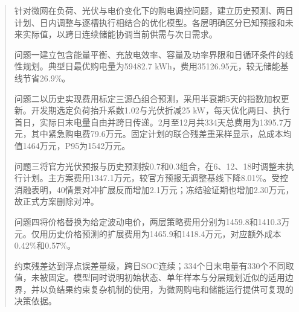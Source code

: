 \begin{abstract}
针对微网在负荷、光伏与电价变化下的购电调控问题，建立历史预测、两日计划、日内调整与逐槽执行相结合的优化模型。各层明确区分已知预报和未来实际值，以跨日连续储能协调当前供需与次日需求。

问题一建立包含能量平衡、充放电效率、容量及功率界限和日循环条件的线性规划。典型日最优购电量为59482.7 kWh，费用35126.95元，较无储能基线节省26.9\%。

问题二以历史实现费用标定三源凸组合预测，采用半衰期5天的指数加权更新。开发期选定负荷抬升系数1.02与光伏折减25 kW，每天优化两日、执行首日，实际日末电量自由并跨日传递。2月至12月共334天总费用为1395.7万元，其中紧急购电费79.6万元。固定计划的联合残差重采样显示，总成本均值1464万元，P95为1542万元。

问题三将官方光伏预报与历史预测按0.7和0.3组合，在6、12、18时调整未执行计划。主方案费用1347.1万元，较官方预报无调整基线下降8.01\%。受控消融表明，40情景对冲扩展反而增加2.1万元；冻结验证期也增加2.30万元，故正式方案删除对冲。

问题四将价格替换为给定波动电价，两层策略费用分别为1459.8和1410.3万元。仅用历史价格预测的扩展费用为1465.9和1418.4万元，对应额外成本0.42\%和0.57\%。

约束残差达到浮点误差量级，跨日SOC连续；334个日末电量有330个不同取值，未被固定。模型同时说明初始状态、单年样本与分层规划近似的适用边界，并以负结果约束复杂机制的使用，为微网购电和储能运行提供可复现的决策依据。
\end{abstract}
